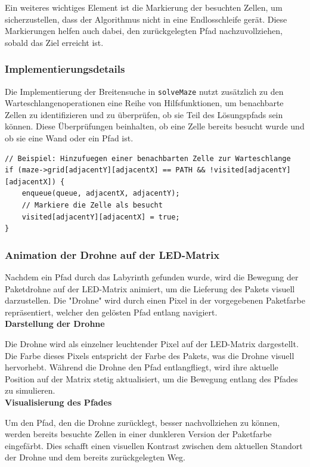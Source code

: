 Ein weiteres wichtiges Element ist die Markierung der besuchten Zellen, um sicherzustellen, dass der Algorithmus nicht in eine Endlosschleife gerät. Diese Markierungen helfen auch dabei, den zurückgelegten Pfad nachzuvollziehen, sobald das Ziel erreicht ist.

\subsubsection{Implementierungsdetails}

Die Implementierung der Breitensuche in \texttt{solveMaze} nutzt zusätzlich zu den Warteschlangenoperationen eine Reihe von Hilfsfunktionen, um benachbarte Zellen zu identifizieren und zu überprüfen, ob sie Teil des Lösungspfads sein können. Diese Überprüfungen beinhalten, ob eine Zelle bereits besucht wurde und ob sie eine Wand oder ein Pfad ist.

\begin{lstlisting}[style=CStyle]
// Beispiel: Hinzufuegen einer benachbarten Zelle zur Warteschlange
if (maze->grid[adjacentY][adjacentX] == PATH && !visited[adjacentY][adjacentX]) {
    enqueue(queue, adjacentX, adjacentY);
    // Markiere die Zelle als besucht
    visited[adjacentY][adjacentX] = true;
}
\end{lstlisting}

\subsubsection{Animation der Drohne auf der LED-Matrix}

Nachdem ein Pfad durch das Labyrinth gefunden wurde, wird die Bewegung der Paketdrohne auf der LED-Matrix animiert, um die Lieferung des Pakets visuell darzustellen. Die "Drohne" wird durch einen Pixel in der vorgegebenen Paketfarbe repräsentiert, welcher den gelösten Pfad entlang navigiert. \\

\noindent \textbf{Darstellung der Drohne}

Die Drohne wird als einzelner leuchtender Pixel auf der LED-Matrix dargestellt. Die Farbe dieses Pixels entspricht der Farbe des Pakets, was die Drohne visuell hervorhebt. Während die Drohne den Pfad entlangfliegt, wird ihre aktuelle Position auf der Matrix stetig aktualisiert, um die Bewegung entlang des Pfades zu simulieren. \\

\noindent \textbf{Visualisierung des Pfades}

Um den Pfad, den die Drohne zurücklegt, besser nachvollziehen zu können, werden bereits besuchte Zellen in einer dunkleren Version der Paketfarbe eingefärbt. Dies schafft einen visuellen Kontrast zwischen dem aktuellen Standort der Drohne und dem bereits zurückgelegten Weg. \\

